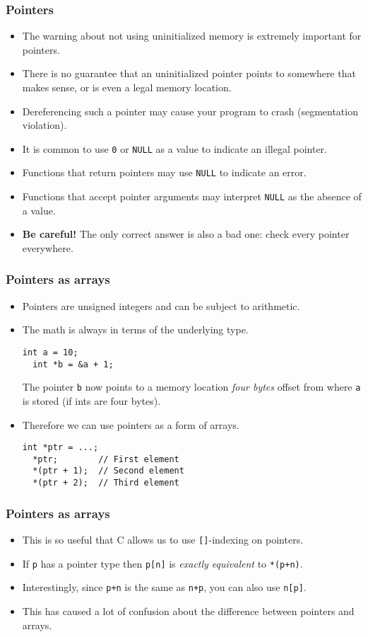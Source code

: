 \begin{frame}
  \frametitle{Pointers}
  \begin{itemize}
  \item The warning about not using uninitialized memory is extremely important
    for pointers.
  \item There is no guarantee that an uninitialized pointer points to
    somewhere that makes sense, or is even a legal memory location.
  \item Dereferencing such a pointer may cause your program to crash
    (segmentation violation).
  \item It is common to use \texttt{0} or \texttt{NULL} as a value to indicate
    an illegal pointer.
  \item Functions that return pointers may use \texttt{NULL} to indicate an
    error.
  \item Functions that accept pointer arguments may interpret \texttt{NULL} as
    the absence of a value.
  \item \textbf{Be careful!} The only correct answer is also a bad one: check
    every pointer everywhere.
  \end{itemize}
\end{frame}

\begin{frame}[fragile]
  \frametitle{Pointers as arrays}
  \begin{itemize}
  \item Pointers are unsigned integers and can be subject to arithmetic.
  \item The math is always in terms of the underlying type.
\begin{lstlisting}[style=c]
  int a = 10;
  int *b = &a + 1;
\end{lstlisting}
    The pointer \texttt{b} now points to a memory location \emph{four bytes}
    offset from where \texttt{a} is stored (if ints are four bytes).
  \item Therefore we can use pointers as a form of arrays.
\begin{lstlisting}[style=c]
  int *ptr = ...;
  *ptr;        // First element
  *(ptr + 1);  // Second element
  *(ptr + 2);  // Third element
\end{lstlisting}
  \end{itemize}
\end{frame}

\begin{frame}[fragile]
  \frametitle{Pointers as arrays}
  \begin{itemize}
  \item This is so useful that C allows us to use \texttt{[]}-indexing on
    pointers.
  \item If \texttt{p} has a pointer type then \texttt{p[n]} is
    \emph{exactly equivalent} to \texttt{*(p+n)}.
  \item Interestingly, since \texttt{p+n} is the same as \texttt{n+p}, you can
    also use \texttt{n[p]}.
  \item This has caused a lot of confusion about the difference between pointers
    and arrays.
  \end{itemize}
\end{frame}

